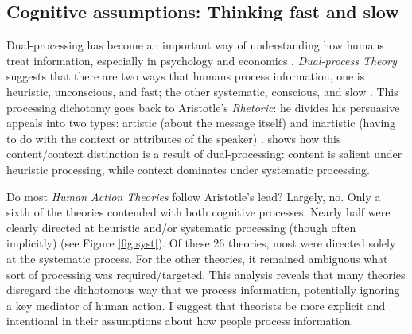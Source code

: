 \documentclass[12 pt]{article}
\begin{document}
\subsection{Cognitive assumptions: Thinking fast and slow }
Dual-processing has become an important way of understanding how humans treat information, especially in psychology and economics \parencite{Evans2008}. \textit{Dual-process Theory} suggests that there are two ways that humans process information, one is heuristic, unconscious, and fast; the other systematic, conscious, and slow \parencite{Chaiken1980,Evans2008,Kahneman2011}. This processing dichotomy goes back to Aristotle's \textit{Rhetoric}: he divides his persuasive appeals into two types: artistic (about the message itself) and inartistic (having to do with the context or attributes of the speaker)  \parencite{Aristotle1954,Littlejohn1983}. \textcite{Chaiken1980} shows how this content/context distinction is a result of dual-processing: content is salient under heuristic processing, while context dominates under systematic processing.

 Do most \textit{Human Action Theories} follow Aristotle's lead? Largely, no. Only a sixth of the theories contended with both cognitive processes. Nearly half were clearly directed at heuristic and/or systematic processing (though often implicitly) (see Figure \ref{fig:syst}). Of these 26 theories, most were directed solely at the systematic process. For the other theories, it remained ambiguous what sort of processing was required/targeted. This analysis reveals that many theories disregard the dichotomous way that we process information, potentially ignoring a key mediator of human action. I suggest that theorists be more explicit and intentional in their assumptions about how people process information.  
 
\end{document}
